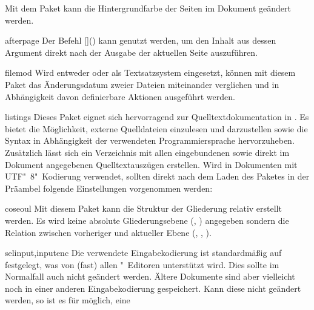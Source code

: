 \begin{packages}
  Mit dem Paket kann die Hintergrundfarbe der Seiten im Dokument geändert 
  werden.
\item[afterpage]
  Der Befehl [\PParameter{\dots}]() kann 
  genutzt werden, um den Inhalt aus dessen Argument direkt nach der Ausgabe der 
  aktuellen Seite auszuführen.
\item[filemod]
  Wird entweder  oder  als Textsatzsystem 
  eingesetzt, können mit diesem Paket das Änderungsdatum zweier Dateien 
  miteinander verglichen und in Abhängigkeit davon definierbare Aktionen 
  ausgeführt werden.
\item[listings]
  Dieses Paket eignet sich hervorragend zur Quelltextdokumentation in 
  . Es bietet die Möglichkeit, externe Quelldateien einzulesen 
  und darzustellen sowie die Syntax in Abhängigkeit der verwendeten 
  Programmiersprache hervorzuheben. Zusätzlich lässt sich ein Verzeichnis mit 
  allen eingebundenen sowie direkt im Dokument angegebenen Quelltextauszügen 
  erstellen.
  Wird  in Dokumenten mit UTF"~8"~Kodierung verwendet, 
  sollten direkt nach dem Laden des Paketes in der Präambel folgende 
  Einstellungen vorgenommen werden:
  \begin{Code}
  \end{Code}\vspace{-\baselineskip}%
\item[coseoul]
  Mit diesem Paket kann die Struktur der Gliederung relativ erstellt werden. 
  Es wird keine absolute Gliederungsebene (, ) 
  angegeben sondern die Relation zwischen vorheriger und aktueller Ebene 
  (, , ).
\item[selinput,inputenc]
  Die verwendete Eingabekodierung ist standardmäßig auf 
  festgelegt, was von (fast) allen "~Editoren unterstützt wird. 
  Dies sollte im Normalfall auch nicht geändert werden. Ältere Dokumente sind 
  aber vielleicht noch in einer anderen Eingabekodierung gespeichert. Kann 
  diese nicht geändert werden, so ist es für  möglich, eine 

\end{packages}

